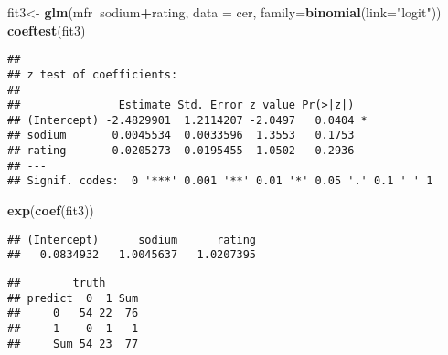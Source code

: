 \documentclass[]{article}
\newenvironment{Shaded}{\begin{snugshade}}{\end{snugshade}}
\newcommand{\CommentTok}[1]{\textcolor[rgb]{0.56,0.35,0.01}{\textit{#1}}}
\newcommand{\DataTypeTok}[1]{\textcolor[rgb]{0.13,0.29,0.53}{#1}}
\newcommand{\DecValTok}[1]{\textcolor[rgb]{0.00,0.00,0.81}{#1}}
\newcommand{\KeywordTok}[1]{\textcolor[rgb]{0.13,0.29,0.53}{\textbf{#1}}}
\newcommand{\NormalTok}[1]{#1}
\newcommand{\OperatorTok}[1]{\textcolor[rgb]{0.81,0.36,0.00}{\textbf{#1}}}
\newcommand{\StringTok}[1]{\textcolor[rgb]{0.31,0.60,0.02}{#1}}
\begin{document}
\begin{Shaded}
\begin{Highlighting}[]
\NormalTok{fit3<-}\StringTok{ }\KeywordTok{glm}\NormalTok{(mfr}\OperatorTok{~}\NormalTok{sodium}\OperatorTok{+}\NormalTok{rating, }\DataTypeTok{data =}\NormalTok{ cer, }\DataTypeTok{family=}\KeywordTok{binomial}\NormalTok{(}\DataTypeTok{link=}\StringTok{"logit"}\NormalTok{))}
\KeywordTok{coeftest}\NormalTok{(fit3)}
\end{Highlighting}
\end{Shaded}

\begin{verbatim}
## 
## z test of coefficients:
## 
##               Estimate Std. Error z value Pr(>|z|)  
## (Intercept) -2.4829901  1.2114207 -2.0497   0.0404 *
## sodium       0.0045534  0.0033596  1.3553   0.1753  
## rating       0.0205273  0.0195455  1.0502   0.2936  
## ---
## Signif. codes:  0 '***' 0.001 '**' 0.01 '*' 0.05 '.' 0.1 ' ' 1
\end{verbatim}

\begin{Shaded}
\begin{Highlighting}[]
\KeywordTok{exp}\NormalTok{(}\KeywordTok{coef}\NormalTok{(fit3))}
\end{Highlighting}
\end{Shaded}

\begin{verbatim}
## (Intercept)      sodium      rating 
##   0.0834932   1.0045637   1.0207395
\end{verbatim}

\begin{Shaded}
\end{Shaded}

\begin{verbatim}
##        truth
## predict  0  1 Sum
##     0   54 22  76
##     1    0  1   1
##     Sum 54 23  77
\end{verbatim}
\end{document}
